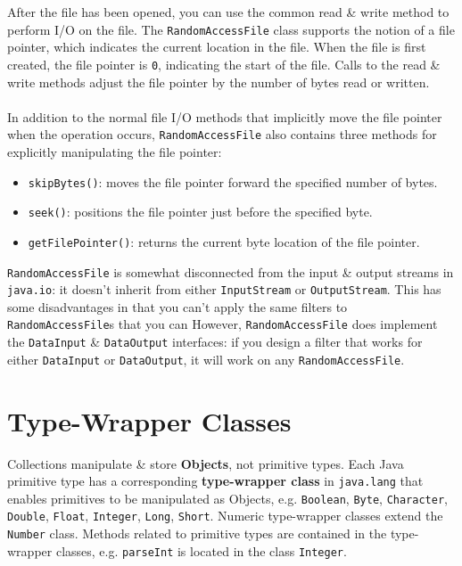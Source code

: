\documentclass[a4paper,11pt]{article}
\begin{document}
After the file has been opened, you can use the common read \& write method to perform I/O on the file. 
The \verb|RandomAccessFile| class supports the notion of a file pointer, which indicates the current location 
in the file.
When the file is first created, the file pointer is \verb|0|, indicating the start of the file.
Calls to the read \& write methods adjust the file pointer by the number of bytes read or written.
\\\\
In addition to the normal file I/O methods that implicitly move the file pointer when the operation occurs, 
\verb|RandomAccessFile| also contains three methods for explicitly manipulating the file pointer:
\begin{itemize}
    \item   \verb|skipBytes()|: moves the file pointer forward the specified number of bytes.
    \item   \verb|seek()|: positions the file pointer just before the specified byte.
    \item   \verb|getFilePointer()|: returns the current byte location of the file pointer.
\end{itemize}

\verb|RandomAccessFile| is somewhat disconnected from the input \& output streams in \verb|java.io|: it 
doesn't inherit from either \verb|InputStream| or \verb|OutputStream|.
This has some disadvantages in that you can't apply the same filters to \verb|RandomAccessFile|s that you can 
However, \verb|RandomAccessFile| does implement the \verb|DataInput| \& \verb|DataOutput| interfaces:
if you design a filter that works for either \verb|DataInput| or \verb|DataOutput|, it will work on any 
\verb|RandomAccessFile|.

\section{Type-Wrapper Classes}
Collections manipulate \& store \textbf{Objects}, not primitive types.
Each Java primitive type has a corresponding \textbf{type-wrapper class} in \verb|java.lang| that enables primitives to be manipulated as Objects, e.g.
\verb|Boolean|, \verb|Byte|, \verb|Character|, \verb|Double|, \verb|Float|, \verb|Integer|, \verb|Long|, \verb|Short|.
Numeric type-wrapper classes extend the \verb|Number| class.
Methods related to primitive types are contained in the type-wrapper classes, e.g. \verb|parseInt| is located in the class \verb|Integer|.
\end{document}
